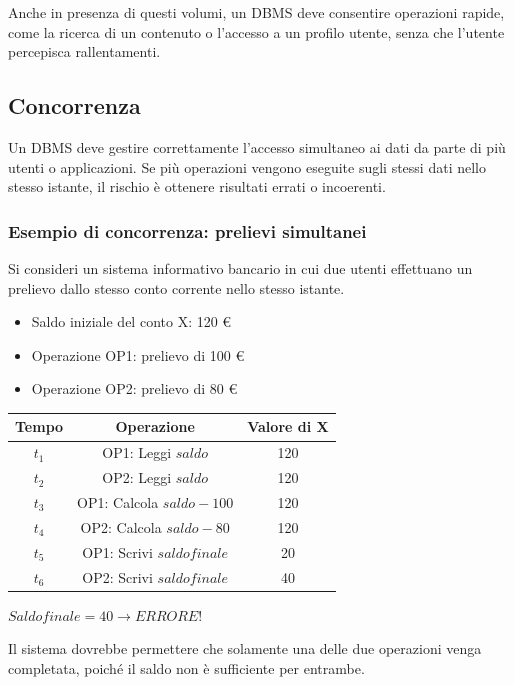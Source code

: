 \documentclass[a4paper,12pt]{article}
\begin{document}
Anche in presenza di questi volumi, un DBMS deve consentire operazioni rapide, come la ricerca di un contenuto o l’accesso a un profilo utente, senza che l’utente percepisca rallentamenti.

\subsection*{Concorrenza}
Un DBMS deve gestire correttamente l’accesso simultaneo ai dati da parte di più utenti o applicazioni. Se più operazioni vengono eseguite sugli stessi dati nello stesso istante, il rischio è ottenere risultati errati o incoerenti.  

\subsubsection*{Esempio di concorrenza: prelievi simultanei}

Si consideri un sistema informativo bancario in cui due utenti effettuano un prelievo dallo stesso conto corrente nello stesso istante.

\begin{itemize}
    \item Saldo iniziale del conto X: 120 €
    \item Operazione OP1: prelievo di 100 €
    \item Operazione OP2: prelievo di 80 €
\end{itemize}


\begin{center}
\begin{tabular}{c c c}
\toprule
Tempo & Operazione & Valore di X \\
\midrule
$t_1$ & OP1: Leggi $saldo$ & 120 \\
$t_2$ & OP2: Leggi $saldo$ & 120 \\
$t_3$ & OP1: Calcola $saldo - 100$ & 120 \\
$t_4$ & OP2: Calcola $saldo - 80$ & 120 \\
$t_5$ & OP1: Scrivi $saldo finale$ & 20 \\
$t_6$ & OP2: Scrivi $saldo finale$ & 40 \\
\bottomrule
\end{tabular}
\end{center}

\begin{center}
$Saldo finale = 40 \rightarrow ERRORE!$
\end{center}


Il sistema dovrebbe permettere che solamente una delle due operazioni venga completata, poiché il saldo non è sufficiente per entrambe.
\end{document}
